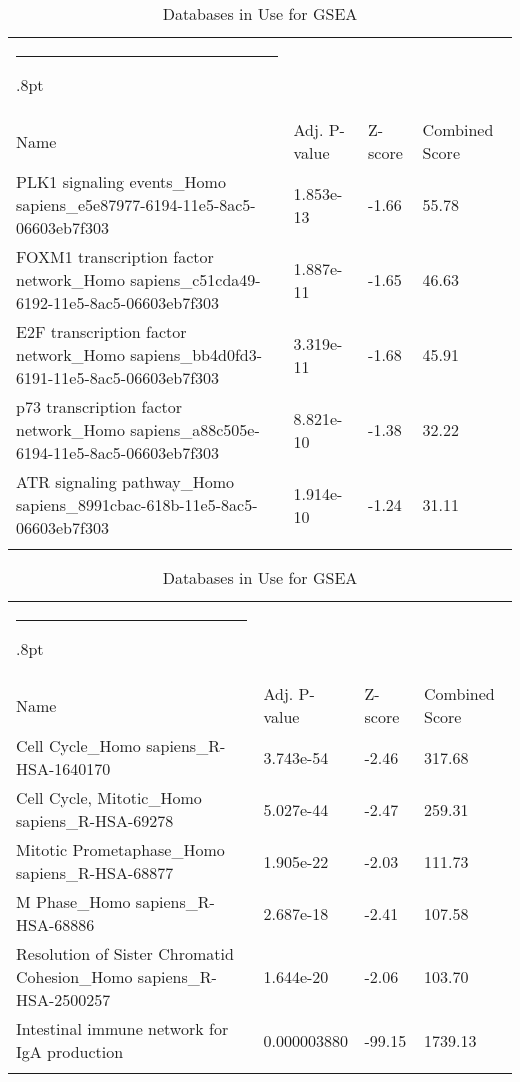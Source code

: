 \documentclass[3p,authoryear,preprint,12pt]{elsarticle}
\makeatletter
\def\hlinewd#1{%
  \noalign{\ifnum0=`}\fi\hrule \@height #1%
  \futurelet\reserved@a\@xhline}
\def\tbltoprule{\hlinewd{.8pt}\\[-12pt]}
\def\tblbottomrule{\noalign{\vspace*{6pt}}\hline\noalign{\vspace*{2pt}}}
\def\tblmidrule{\noalign{\vspace*{6pt}}\hline\noalign{\vspace*{2pt}}}
\makeatother
\begin{document}
\begin{table*}[!htbp]
	\caption{{Databases in Use for GSEA} }
	\label{tw-de478ae31cc6}
	\def\arraystretch{1}
	\ignorespaces 
	\centering 
	\begin{tabulary}{\linewidth}{p{\dimexpr.65\tabcolsep}p{\dimexpr.15\tabcolsep}p{\dimexpr.1\tabcolsep}p{\dimexpr.1\tabcolsep}}
		\tbltoprule Name & Adj. P-value & Z-score & Combined Score\\
		\tblmidrule
PLK1 signaling events\_Homo sapiens\_e5e87977-6194-11e5-8ac5-06603eb7f303 & 1.853e-13 & -1.66 & 55.78 \\
FOXM1 transcription factor network\_Homo sapiens\_c51cda49-6192-11e5-8ac5-06603eb7f303 & 1.887e-11 & -1.65 & 46.63 \\
E2F transcription factor network\_Homo sapiens\_bb4d0fd3-6191-11e5-8ac5-06603eb7f303 & 3.319e-11 & -1.68 & 45.91 \\
p73 transcription factor network\_Homo sapiens\_a88c505e-6194-11e5-8ac5-06603eb7f303 & 8.821e-10 & -1.38 & 32.22 \\
ATR signaling pathway\_Homo sapiens\_8991cbac-618b-11e5-8ac5-06603eb7f303 & 1.914e-10 & -1.24 & 31.11 \\
		\tblbottomrule
	\end{tabulary}\par 
\end{table*}
\begin{table*}[!htbp]
	\caption{{Databases in Use for GSEA} }
	\label{tw-de478ae31cc6}
	\def\arraystretch{1}
	\ignorespaces 
	\centering 
	\begin{tabulary}{\linewidth}{p{\dimexpr.65\tabcolsep}p{\dimexpr.15\tabcolsep}p{\dimexpr.1\tabcolsep}p{\dimexpr.1\tabcolsep}}
		\tbltoprule Name & Adj. P-value & Z-score & Combined Score\\
		\tblmidrule
Cell Cycle\_Homo sapiens\_R-HSA-1640170 & 3.743e-54 & -2.46 & 317.68 \\
Cell Cycle, Mitotic\_Homo sapiens\_R-HSA-69278 & 5.027e-44 & -2.47 & 259.31 \\
Mitotic Prometaphase\_Homo sapiens\_R-HSA-68877 & 1.905e-22 & -2.03 & 111.73 \\
M Phase\_Homo sapiens\_R-HSA-68886 & 2.687e-18 & -2.41 & 107.58 \\
Resolution of Sister Chromatid Cohesion\_Homo sapiens\_R-HSA-2500257 & 1.644e-20 & -2.06 & 103.70 \\
Intestinal immune network for IgA production & 0.000003880 & -99.15 & 1739.13 \\
		\tblbottomrule
	\end{tabulary}\par 
\end{table*}
\end{document}
